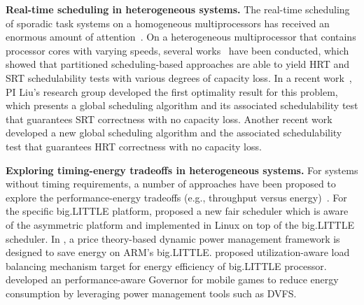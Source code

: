 \vspace{1mm} \noindent \textbf{Real-time scheduling in heterogeneous systems.} The real-time scheduling of sporadic task systems on a homogeneous multiprocessors has received an enormous amount of attention~\cite{andersson2003, baker2007, funk2005, Baruah2006a, chattopadhyay2011, baruah2005a, baruah2008, bertogna2011b, BC, baruah1996, goossens2003, baker2003, Cluster1, davis2011a, devi2005, baruah1996, baruah2007, G, Par}.  On a heterogeneous multiprocessor that contains processor cores with varying speeds, several works~\cite{?} have been conducted, which showed that partitioned scheduling-based approaches are able to yield HRT and SRT schedulability tests with various degrees of capacity loss. In a recent work~\cite{?}, PI Liu's research group  developed the first optimality result for this problem, which presents a global scheduling algorithm and its associated schedulability test that guarantees SRT correctness with no capacity loss. Another recent work~\cite{?} developed a new global scheduling algorithm and the associated schedulability test that guarantees HRT correctness with no capacity loss. 

\vspace{1mm} \noindent \textbf{Exploring timing-energy tradeoffs in heterogeneous systems.} For systems without timing requirements, a number of approaches have been proposed to explore the performance-energy tradeoffs (e.g., throughput versus energy)~\cite{muthukaruppan2014price, chen2014adaptive, muck2015run, sarma2015smartbalance, lin2014energy, tan2015approximation, elewi2014energy, annamalai2014reducing, yavits2014effect, beaumont2014analysis, gutierrez2014evaluating}. For the specific big.LITTLE platform,  
\cite{kim2015fair} proposed a new fair scheduler which is aware of the asymmetric platform and implemented in Linux on top of the big.LITTLE scheduler. In \cite{muthukaruppan2014price}, a price theory-based dynamic power management framework is designed to save energy on ARM's big.LITTLE.\cite{kim2014utilization} proposed utilization-aware load balancing mechanism target for energy efficiency of big.LITTLE processor. \cite{pathania2015power} developed an performance-aware Governor for mobile games to reduce energy consumption by leveraging power management tools such as DVFS.

